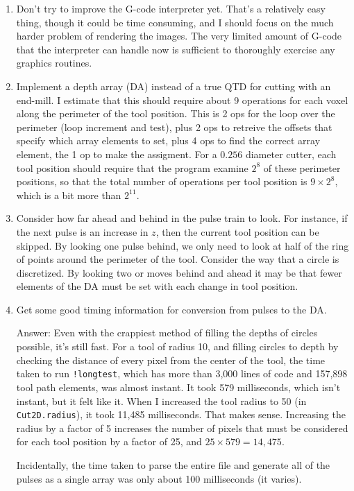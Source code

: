 \documentclass[titlepage,oneside,10pt]{article}
\begin{document}
\begin{enumerate}
\item Don't try to improve the G-code interpreter yet. That's a
  relatively easy thing, though it could be time consuming, and I
  should focus on the much harder problem of rendering the images. The
  very limited amount of G-code that the interpreter can handle now is
  sufficient to thoroughly exercise any graphics routines.
\item Implement a depth array (DA) instead of a true QTD for cutting
  with an end-mill. I estimate that this should require about 9
  operations for each voxel along the perimeter of the tool
  position. This is 2 ops for the loop over the perimeter (loop
  increment and test), plus 2 ops to retreive the offsets that
  specify which array elements to set, plus 4 ops to find the correct
  array element, the 1 op to make the assigment. For a $0.256$
  diameter cutter, each tool position should require that the program
  examine $2^8$ of these perimeter positions, so that the total number
  of operations per tool position is $9\times 2^8$, which is a bit
  more than $2^{11}$.
\item Consider how far ahead and behind in the pulse train to
  look. For instance, if the next pulse is an increase in $z$, then
  the current tool position can be skipped. By looking one pulse
  behind, we only need to look at half of the ring of points around
  the perimeter of the tool. Consider the way that a circle is
  discretized. By looking two or moves behind and ahead it may be that
  fewer elements of the DA must be set with each change in tool position.
\item Get some good timing information for conversion from pulses to
  the DA.

Answer: Even with the crappiest method of filling the depths of circles
possible, it's still fast. For a tool of radius 10, and filling
circles to depth by checking the distance of every pixel from the
center of the tool, the time taken to run {\tt !longtest}, which has
more than 3,000 lines of code and 157,898 tool path elements, was
almost instant. It took 579 milliseconds, which isn't instant, but it
felt like it. When I increased the tool radius to 50 (in {\tt
  Cut2D.radius}), it took 11,485 
milliseconds. That makes sense. Increasing the radius by a factor of 5
increases the number of pixels that must be considered for each tool
position by a factor of 25, and $25\times 579 = 14,475$.

Incidentally, the time taken to parse the entire file and generate all
of the pulses as a single array was only about 100 milliseconds (it
varies).


\end{enumerate}
\end{document}
